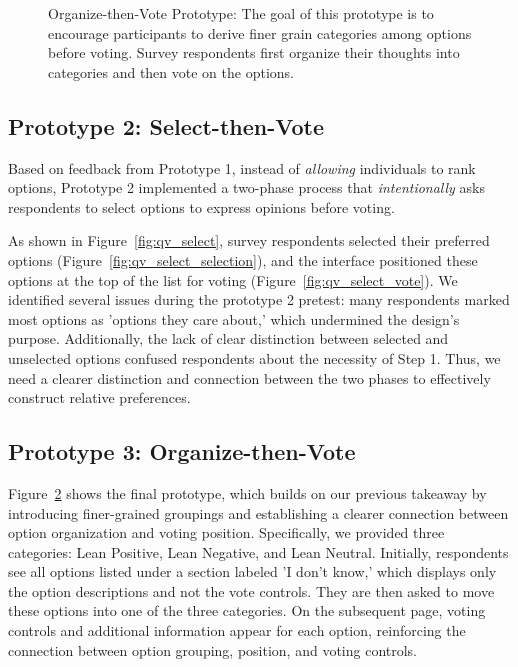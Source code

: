 \begin{figure}[p]
\begin{subfigure}[b]{0.45\textwidth}
        \label{fig:qv_org_p2}
    \end{subfigure}
    \caption{Organize-then-Vote Prototype: The goal of this prototype is to encourage participants to derive finer grain categories among options before voting. Survey respondents first organize their thoughts into categories and then vote on the options.}
    \label{fig:qv_org}
\end{figure}

\subsection{Prototype 2: Select-then-Vote}
Based on feedback from Prototype 1, instead of \textit{allowing} individuals to rank options, Prototype 2 implemented a two-phase process that \textit{intentionally} asks respondents to select options to express opinions before voting. 

As shown in Figure~\ref{fig:qv_select}, survey respondents selected their preferred options (Figure~\ref{fig:qv_select_selection}), and the interface positioned these options at the top of the list for voting (Figure~\ref{fig:qv_select_vote}). We identified several issues during the prototype 2 pretest: many respondents marked most options as 'options they care about,' which undermined the design's purpose. Additionally, the lack of clear distinction between selected and unselected options confused respondents about the necessity of Step 1. Thus, we need a clearer distinction and connection between the two phases to effectively construct relative preferences.

\subsection{Prototype 3: Organize-then-Vote}
Figure~\ref{fig:qv_org} shows the final prototype, which builds on our previous takeaway by introducing finer-grained groupings and establishing a clearer connection between option organization and voting position. Specifically, we provided three categories: Lean Positive, Lean Negative, and Lean Neutral. Initially, respondents see all options listed under a section labeled 'I don't know,' which displays only the option descriptions and not the vote controls. They are then asked to move these options into one of the three categories. On the subsequent page, voting controls and additional information appear for each option, reinforcing the connection between option grouping, position, and voting controls.

